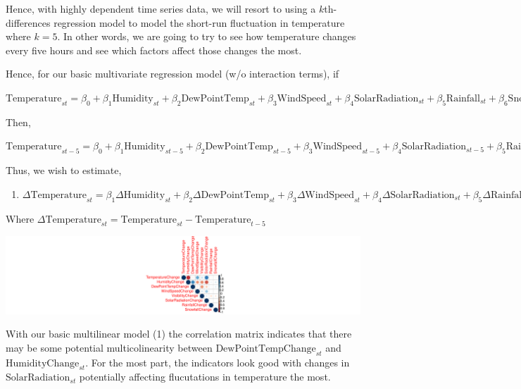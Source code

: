 \documentclass[
  letterpaper,
  DIV=11,
  numbers=noendperiod]{scrartcl}
\providecommand{\tightlist}{%
  \setlength{\itemsep}{0pt}\setlength{\parskip}{0pt}}\usepackage{longtable,booktabs,array}
\begin{document}
Hence, with highly dependent time series data, we will resort to using a
\(k\)th-differences regression model to model the short-run fluctuation
in temperature where \(k = 5\). In other words, we are going to try to
see how temperature changes every five hours and see which factors
affect those changes the most.

Hence, for our basic multivariate regression model (w/o interaction
terms), if

\(\text{Temperature}_{st} = \beta_0 + \beta_1\text{Humidity}_{st} + \beta_2\text{DewPointTemp}_{st} + \beta_3\text{WindSpeed}_{st} + \beta_4\text{SolarRadiation}_{st} + \beta_5\text{Rainfall}_{st} + \beta_6\text{Snowfall}_{st} + \beta_7I(\text{Hour}_t = 1) + ... + \beta_{29}I(\text{Hour}_t = 23) + \alpha_{s} + \eta_{st}\)

Then,

\(\text{Temperature}_{st-5} = \beta_0 + \beta_1\text{Humidity}_{st-5} + \beta_2\text{DewPointTemp}_{st-5} + \beta_3\text{WindSpeed}_{st-5} + \beta_4\text{SolarRadiation}_{st-5} + \beta_5\text{Rainfall}_{st-5} + \beta_6\text{Snowfall}_{st-5} + \beta_7I(\text{Hour}_{t-5} = 1) + ... + \beta_{29}I(\text{Hour}_{t-5} = 23) + \alpha_{s} + \eta_{st-5}\)

Thus, we wish to estimate,

\begin{enumerate}
\def\labelenumi{(\arabic{enumi})}
\tightlist
\item
  \(\Delta\text{Temperature}_{st} = \beta_1\Delta\text{Humidity}_{st} + \beta_2\Delta\text{DewPointTemp}_{st} + \beta_3\Delta\text{WindSpeed}_{st} + \beta_4\Delta\text{SolarRadiation}_{st} + \beta_5\Delta\text{Rainfall}_{st} + \beta_6\Delta\text{Snowfall}_{st} + \Delta\beta_7I(\text{Hour}_{t} = 1) + ... + \Delta\beta_{29}I(\text{Hour}_{t} = 23) + \Delta\eta_{st}\)
\end{enumerate}

Where
\(\Delta\text{Temperature}_{st} = \text{Temperature}_{st} - \text{Temperature}_{t-5}\)

\includegraphics{seoul_files/figure-pdf/unnamed-chunk-2-1.pdf}

With our basic multilinear model (1) the correlation matrix indicates
that there may be some potential multicolinearity between
\(\text{DewPointTempChange}_{st}\) and \(\text{HumidityChange}_{st}\).
For the most part, the indicators look good with changes in
\(\text{SolarRadiation}_{st}\) potentially affecting flucutations in
temperature the most.
\end{document}
